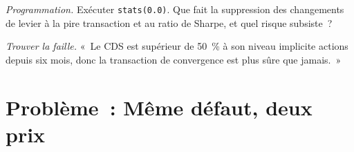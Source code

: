 \begin{exercise}[$\star\star\star$]\label{exo:s2:capital-structure-arbitrage:7}
\emph{Programmation.} Exécuter \texttt{stats(0.0)}. Que fait la suppression des changements de levier à la pire transaction et au ratio de Sharpe, et quel risque subsiste~?
\end{exercise}

\begin{exercise}[$\star\star\star$]\label{exo:s2:capital-structure-arbitrage:8}
\emph{Trouver la faille.} «~Le CDS est supérieur de 50~\% à son niveau implicite actions depuis six mois, donc la transaction de convergence est plus sûre que jamais.~»
\end{exercise}

\section{Problème~: Même défaut, deux prix}

